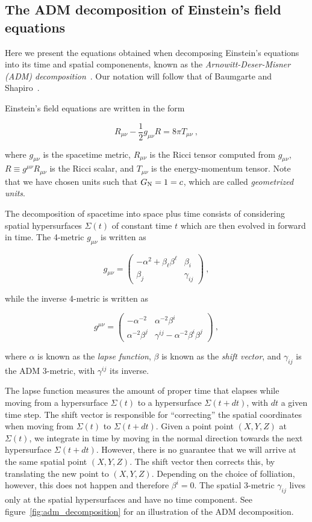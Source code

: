 \documentclass[a4paper,11pt]{article}
\renewcommand{\a}{\alpha}
\renewcommand{\b}{\beta}
\newcommand{\g}{\gamma}
\newcommand{\gDD}[2]{\g_{{#1}{#2}}}
\newcommand{\gUU}[2]{\g^{{#1}{#2}}}
\newcommand{\GDD}[2]{g_{{#1}{#2}}}
\newcommand{\GUU}[2]{g^{{#1}{#2}}}
\newcommand{\lrpar}[1]{\left( #1 \right)}
\newcommand{\n}{\noindent}
\newcommand{\eq}[1]{
  \begin{equation}
    #1
  \end{equation}
}
\begin{document}
\subsection{The ADM decomposition of Einstein's field equations}

Here we present the equations obtained when decomposing Einstein's equations into its time and spatial componenents, known as the \emph{Arnowitt-Deser-Misner (ADM) decomposition}~\cite{Arnowitt:1959ah}. Our notation will follow that of Baumgarte and Shapiro~\cite{Baumgarte:2010ndz}.

Einstein's field equations are written in the form

\eq{
  R_{\mu\nu} - \frac{1}{2}\GDD{\mu}{\nu}R = 8\pi T_{\mu\nu}\ ,
}

\n where $\GDD{\mu}{\nu}$ is the spacetime metric, $R_{\mu\nu}$ is the Ricci tensor computed from $\GDD{\mu}{\nu}$, $R \equiv \GUU{\mu}{\nu}R_{\mu\nu}$ is the Ricci scalar, and $T_{\mu\nu}$ is the energy-momentum tensor. Note that we have chosen units such that $G_{\rm N}=1=c$, which are called \emph{geometrized units}.

The decomposition of spacetime into space plus time consists of considering spatial hypersurfaces $\Sigma\lrpar{t}$ of constant time $t$ which are then evolved in forward in time. The 4-metric $\GDD{\mu}{\nu}$ is written as

\eq{
  \GDD{\mu}{\nu} =
  \begin{pmatrix}
    -\a^{2} + \b_{\ell}\b^{\ell} & \b_{i}\\
    \b_{j} & \gDD{i}{j}
  \end{pmatrix}\ ,
}

\n while the inverse 4-metric is written as

\eq{
  \GUU{\mu}{\nu} =
  \begin{pmatrix}
    -\a^{-2} & \a^{-2}\b^{i}\\
    \a^{-2}\b^{j} & \gUU{i}{j} - \a^{-2}\b^{i}\b^{j}
  \end{pmatrix}\ ,
}

\n where $\a$ is known as the \emph{lapse function}, $\b$ is known as the \emph{shift vector}, and $\gDD{i}{j}$ is the ADM 3-metric, with $\gUU{i}{j}$ its inverse.

The lapse function measures the amount of proper time that elapses while moving from a hypersurface $\Sigma\lrpar{t}$ to a hypersurface $\Sigma\lrpar{t+dt}$, with $dt$ a given time step. The shift vector is responsible for ``correcting'' the spatial coordinates when moving from $\Sigma\lrpar{t}$ to $\Sigma\lrpar{t+dt}$. Given a point point $(X,Y,Z)$ at $\Sigma\lrpar{t}$, we integrate in time by moving in the normal direction towards the next hypersurface $\Sigma\lrpar{t+dt}$. However, there is no guarantee that we will arrive at the same spatial point $(X,Y,Z)$. The shift vector then corrects this, by translating the new point to $(X,Y,Z)$. Depending on the choice of folliation, however, this does not happen and therefore $\b^{i}=0$. The spatial 3-metric $\gDD{i}{j}$ lives only at the spatial hypersurfaces and have no time component. See figure~\ref{fig:adm_decomposition} for an illustration of the ADM decomposition.
\end{document}
